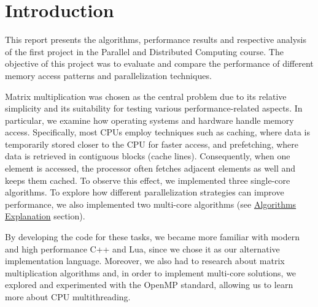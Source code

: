 \section{Introduction} \label{section:introduction}

This report presents the algorithms, performance results and respective analysis of the first project in the Parallel and Distributed Computing course. The objective of this project was to evaluate and compare the performance of different memory access patterns and parallelization techniques.

Matrix multiplication was chosen as the central problem due to its relative simplicity and its suitability for testing various performance-related aspects. In particular, we examine how operating systems and hardware handle memory access. Specifically, most CPUs employ techniques such as caching, where data is temporarily stored closer to the CPU for faster access, and prefetching, where data is retrieved in contiguous blocks (cache lines). Consequently, when one element is accessed, the processor often fetches adjacent elements as well and keeps them cached. To observe this effect, we implemented three single-core algorithms. To explore how different parallelization strategies can improve performance, we also implemented two multi-core algorithms (see \hyperref[section:algorithms]{Algorithms Explanation} section).

By developing the code for these tasks, we became more familiar with modern and high performance C++ and Lua, since we chose it as our alternative implementation language. Moreover, we also had to research about matrix multiplication algorithms and, in order to implement multi-core solutions, we explored and experimented with the OpenMP standard, allowing us to learn more about CPU multithreading.
